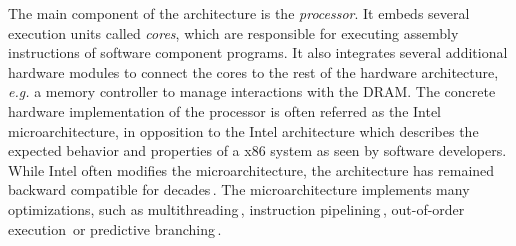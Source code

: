 The main component of the architecture is the \emph{processor}.
%
It embeds several execution units called \emph{cores}, which are responsible for
executing assembly instructions of software component programs.
%
It also integrates several additional hardware modules to connect the cores to
the rest of the hardware architecture, \emph{e.g.} a memory controller to manage
interactions with the DRAM.
%
The concrete hardware implementation of the processor is often referred as the
Intel microarchitecture, in opposition to the Intel architecture which describes
the expected behavior and properties of a x86 system as seen by software
developers.
%
While Intel often modifies the microarchitecture, the architecture has remained
backward compatible for decades\,\cite{turley2014introx86}.
%
The microarchitecture implements many optimizations, such as
multithreading\,\cite{marr2002hypertheading}, instruction
pipelining\,\cite{fog2012microarchitecture}, out-of-order
execution\,\cite[Section 2]{fog2012microarchitecture} or predictive
branching\,\cite{milenkovic2002branchprediction}\cite[Section
3]{fog2012microarchitecture}.
%
%
